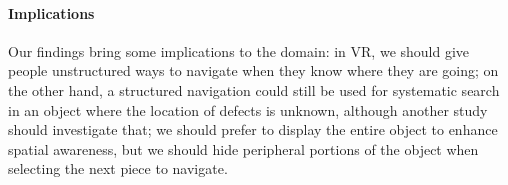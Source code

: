 \paragraph{Implications} Our findings bring some implications to the domain: in VR, we should give people unstructured ways to navigate when they know where they are going; on the other hand, a structured navigation could still be used for systematic search in an object where the location of defects is unknown, although another study should investigate that; we should prefer to display the entire object to enhance spatial awareness, but we should hide peripheral portions of the object when selecting the next piece to navigate.